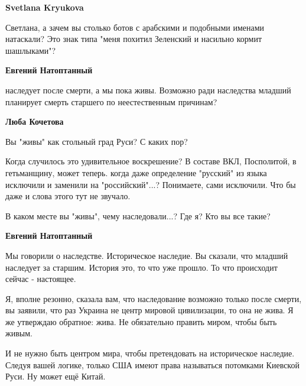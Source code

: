 \begin{itemize}
\begin{itemize}
\textbf{Svetlana Kryukova} 

Светлана, а зачем вы столько ботов с арабскими и подобными именами натаскали?
Это знак типа "меня похитил Зеленский и насильно кормит шашлыками"?


 
\textbf{Евгений Натоптанный} 

наследует после смерти, а мы пока живы. Возможно ради наследства младший
планирует смерть старшего по неестественным причинам?

 
\textbf{Люба Кочетова} 

Вы "живы" как стольный град Руси? С каких пор?

Когда случилось это удивительное воскрешение? В составе ВКЛ, Посполитой, в
гетьманщину, может теперь. когда даже определение "русский" из языка исключили
и заменили на "российский"...? Понимаете, сами исключили. Что бы даже и слова
этого тут не звучало.

В каком месте вы "живы", чему наследовали...? Где я? Кто вы все такие?


 
\textbf{Евгений Натоптанный} 

Мы говорили о наследстве. Историческое наследие. Вы сказали, что младший
наследует за старшим. История это, то что уже прошло. То что происходит сейчас
- настоящее. 

Я, вполне резонно, сказала вам, что наследование возможно только после смерти,
вы заявили, что раз Украина не центр мировой цивилизации, то она не жива. Я же
утверждаю обратное: жива. Не обязательно править миром, чтобы быть живым. 

И не нужно быть центром мира, чтобы претендовать на историческое наследие.
Следуя вашей логике, только США имеют права называться потомками Киевской Руси.
Ну может ещё Китай.


\end{itemize}
\end{itemize}
